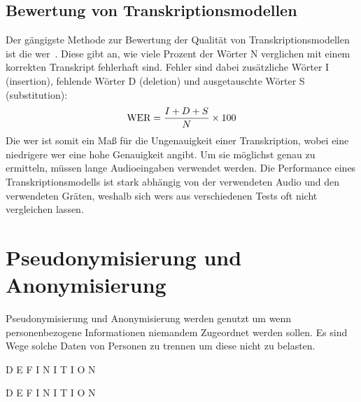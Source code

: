 \subsection{Bewertung von Transkriptionsmodellen}
Der gängigste Methode zur Bewertung der Qualität von Transkriptionsmodellen ist die \ac{wer}~\citep{wer}.
Diese gibt an, wie viele Prozent der Wörter N verglichen mit einem korrekten Transkript fehlerhaft sind.
Fehler sind dabei zusätzliche Wörter I (insertion), fehlende Wörter D (deletion) und ausgetauschte Wörter S (substitution):
\[\textnormal{WER} = \frac{I + D + S}{N} \times 100\]
Die \ac{wer} ist somit ein Maß für die Ungenauigkeit einer Transkription, wobei eine niedrigere \ac{wer} eine hohe Genauigkeit angibt.
Um sie möglichst genau zu ermitteln, müssen lange Audioeingaben verwendet werden.
Die Performance eines Transkriptionsmodells ist stark abhängig von der verwendeten Audio und den verwendeten Gräten, weshalb sich \acp{wer} aus verschiedenen Tests oft nicht vergleichen lassen.

\section{Pseudonymisierung und Anonymisierung}
Pseudonymisierung und Anonymisierung werden genutzt um wenn personenbezogene Informationen niemandem Zugeordnet werden sollen.
Es sind Wege solche Daten von Personen zu trennen um diese nicht zu belasten.

\begin{definition}[Pseudonymisierung]
D E F I N I T I O N
\end{definition}

\begin{definition}[Anonymisierung]
D E F I N I T I O N
\end{definition}